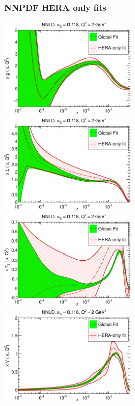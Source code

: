 \documentclass[10pt]{beamer}
\begin{document}
\begin{frame}
\frametitle{ NNPDF HERA only fits }

\includegraphics[width=0.50\textwidth]{figures/xg-abs-30_vs_heraonly.eps}
\includegraphics[width=0.50\textwidth]{figures/xsinglet-abs-30_vs_heraonly.eps}\\
\includegraphics[width=0.50\textwidth]{figures/xtriplet-abs-30_vs_heraonly.eps}
\includegraphics[width=0.50\textwidth]{figures/xvalence-abs-30_vs_heraonly.eps}
\end{frame}
\end{document}
